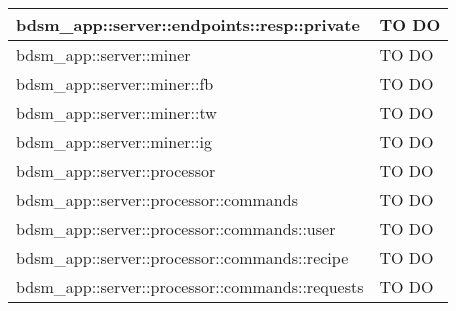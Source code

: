 \begin{center}
\begin{longtable}{| p{9cm} | p{4cm} |}
bdsm\_app::server::endpoints::resp::private  &  TO DO \\
\hline
bdsm\_app::server::miner  &  TO DO \\
\hline
bdsm\_app::server::miner::fb  &  TO DO \\
\hline
bdsm\_app::server::miner::tw  &  TO DO \\
\hline
bdsm\_app::server::miner::ig  &  TO DO \\
\hline
bdsm\_app::server::processor  &  TO DO \\
\hline
bdsm\_app::server::processor::commands  &  TO DO \\
\hline
bdsm\_app::server::processor::commands::user  &  TO DO \\
\hline
bdsm\_app::server::processor::commands::recipe  &  TO DO \\
\hline
bdsm\_app::server::processor::commands::requests  &  TO DO \\
\hline
\end{longtable}
\egroup
\end{center}
